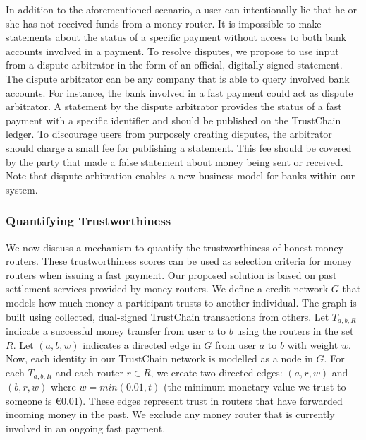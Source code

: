 In addition to the aforementioned scenario, a user can intentionally lie that he or she has not received funds from a money router. %
It is impossible to make statements about the status of a specific payment without access to both bank accounts involved in a payment.
To resolve disputes, we propose to use input from a dispute arbitrator in the form of an official, digitally signed statement.
The dispute arbitrator can be any company that is able to query involved bank accounts.
For instance, the bank involved in a fast payment could act as dispute arbitrator.
A statement by the dispute arbitrator provides the status of a fast payment with a specific identifier and should be published on the TrustChain ledger.
To discourage users from purposely creating disputes, the arbitrator should charge a small fee for publishing a statement.
This fee should be covered by the party that made a false statement about money being sent or received.
Note that dispute arbitration enables a new business model for banks within our system.




\subsubsection*{Quantifying Trustworthiness}
\label{sec:estimate_trust}
We now discuss a mechanism to quantify the trustworthiness of honest money routers.
These trustworthiness scores can be used as selection criteria for money routers when issuing a fast payment.
Our proposed solution is based on past settlement services provided by money routers.
We define a credit network $ G $ that models how much money a participant trusts to another individual.
The graph is built using collected, dual-signed TrustChain transactions from others.
Let $ T_{a,b,R} $ indicate a successful money transfer from user $ a $ to $ b $ using the routers in the set $ R $. %
Let $ (a, b, w) $ indicates a directed edge in $ G $ from user $ a $ to $ b $ with weight $ w $.
Now, each identity in our TrustChain network is modelled as a node in $ G $.
For each $ T_{a,b,R} $ and each router $ r \in R $, we create two directed edges: $ (a, r, w) $ and $ (b, r, w) $ where $ w = min(0.01, t) $ (the minimum monetary value we trust to someone is \euro 0.01).
These edges represent trust in routers that have forwarded incoming money in the past.
We exclude any money router that is currently involved in an ongoing fast payment.

